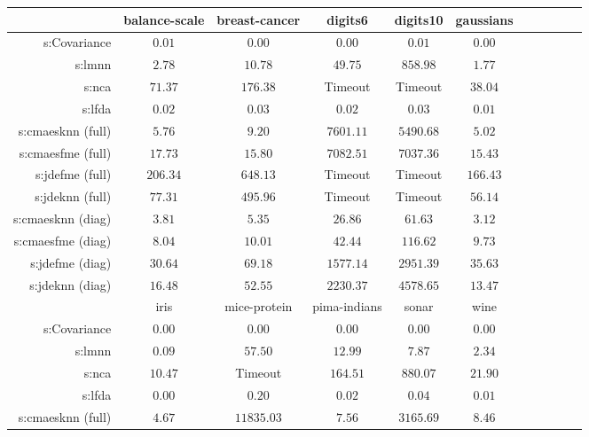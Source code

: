 \begin{table}[ht] \centering
{\small\renewcommand{\arraystretch}{1.0}
\setlength{\tabcolsep}{2pt}
\begin{tabular}{rcccccccccc}
\toprule


& \multicolumn{1}{c}{balance-scale} & \multicolumn{1}{c}{breast-cancer} & \multicolumn{1}{c}{digits6} & \multicolumn{1}{c}{digits10} & \multicolumn{1}{c}{gaussians} \\ 
\midrule
s:Covariance & $\bm{0.01}$ & $\bm{0.00}$ & $\bm{0.00}$ & $\bm{0.01}$ & $\bm{0.00}$ \\
s:\ac{lmnn} & $2.78$ & $10.78$ & $49.75$ & $858.98$ & $1.77$ \\
s:\ac{nca} & $71.37$ & $176.38$ & Timeout  & Timeout  & $38.04$ \\
s:\ac{lfda} & $0.02$ & $0.03$ & $0.02$ & $0.03$ & $0.01$ \\
s:\ac{cmaesknn} (full) & $5.76$ & $9.20$ & $7601.11$ & $5490.68$ & $5.02$ \\
s:\ac{cmaesfme} (full) & $17.73$ & $15.80$ & $7082.51$ & $7037.36$ & $15.43$ \\
s:\ac{jdefme} (full) & $206.34$ & $648.13$ & Timeout  & Timeout  & $166.43$ \\
s:\ac{jdeknn} (full) & $77.31$ & $495.96$ & Timeout  & Timeout  & $56.14$ \\
s:\ac{cmaesknn} (diag) & $3.81$ & $5.35$ & $26.86$ & $61.63$ & $3.12$ \\
s:\ac{cmaesfme} (diag) & $8.04$ & $10.01$ & $42.44$ & $116.62$ & $9.73$ \\
s:\ac{jdefme} (diag) & $30.64$ & $69.18$ & $1577.14$ & $2951.39$ & $35.63$ \\
s:\ac{jdeknn} (diag) & $16.48$ & $52.55$ & $2230.37$ & $4578.65$ & $13.47$ \\
\midrule
& \multicolumn{1}{c}{iris} & \multicolumn{1}{c}{mice-protein} & \multicolumn{1}{c}{pima-indians} & \multicolumn{1}{c}{sonar} & \multicolumn{1}{c}{wine} \\ 
\midrule
s:Covariance & $\bm{0.00}$ & $\bm{0.00}$ & $\bm{0.00}$ & $\bm{0.00}$ & $\bm{0.00}$ \\
s:\ac{lmnn} & $0.09$ & $57.50$ & $12.99$ & $7.87$ & $2.34$ \\
s:\ac{nca} & $10.47$ & Timeout  & $164.51$ & $880.07$ & $21.90$ \\
s:\ac{lfda} & $\bm{0.00}$ & $0.20$ & $0.02$ & $0.04$ & $0.01$ \\
s:\ac{cmaesknn} (full) & $4.67$ & $11835.03$ & $7.56$ & $3165.69$ & $8.46$ \\

\end{tabular}}
\end{table}
